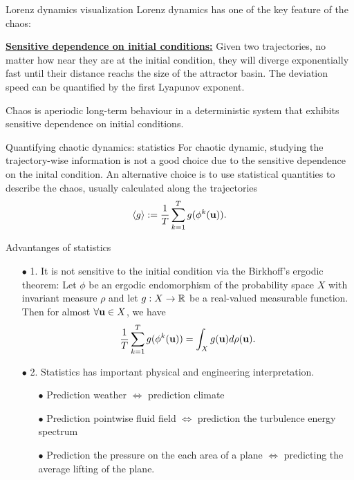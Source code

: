 \documentclass{beamer}
\begin{document}
\begin{frame}{Lorenz dynamics visualization}
	Lorenz dynamics has one of the key feature of the chaos: 

	\href{https://www.youtube.com/watch?v=FYE4JKAXSfY}{\textbf{Sensitive dependence on initial conditions:}}
	Given two trajectories, no matter how near they are at the initial condition, they will
	diverge exponentially fast until their distance reachs the size of the attractor basin. The deviation speed
	can be quantified by the first Lyapunov exponent.

	\begin{definition}
		Chaos is aperiodic long-term behaviour in a deterministic system that 
	exhibits sensitive dependence on initial conditions.
	\end{definition}
\end{frame}

\begin{frame}{Quantifying chaotic dynamics: statistics}
	For chaotic dynamic, studying the trajectory-wise information is not a good choice
	due to the sensitive dependence on the inital condition. An alternative choice is to 
	use statistical quantities to describe the chaos, usually calculated along the trajectories
	\begin{equation}
		\left\langle g \right\rangle := \frac{1}{T}\sum_{k=1}^T g(\phi^k(\mathbf{u})).
	\end{equation}
	
\end{frame}

\begin{frame}{Advantanges of statistics}
	\begin{itemize}
		\item[$\bullet$] 1. It is not sensitive to the initial condition via the Birkhoff's ergodic theorem:
		Let $\phi$ be an ergodic endomorphism of the probability space $X$ with invariant measure $\rho$ and let $g:X\rightarrow \mathbb{R}$ be a real-valued 
		measurable function. Then for almost $\forall \mathbf{u} \in X$, we have
		\begin{equation}
			\frac{1}{T}\sum_{k=1}^T g(\phi^k(\mathbf{u})) = \int_X g(\mathbf{u})d\rho(\mathbf{u}).
		\end{equation}
		\item[$\bullet$] 2. Statistics has important physical and engineering interpretation.
		\begin{itemize}
			\item[$\bullet$] Prediction weather $\Longleftrightarrow$ prediction climate
			\item[$\bullet$] Prediction pointwise fluid field $\Longleftrightarrow$ prediction the turbulence energy spectrum
			\item[$\bullet$] Prediction the pressure on the each area of a plane $\Longleftrightarrow$ predicting the average lifting 
			of the plane.
		\end{itemize} 
	\end{itemize}
\end{frame}
\end{document}

